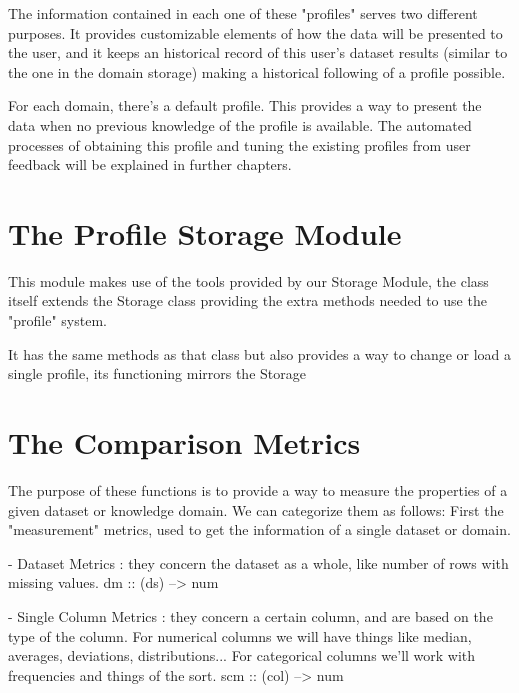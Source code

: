 The information contained in each one of these "profiles" serves two different purposes. It provides customizable elements of  how  the data will be presented to the user, and it keeps an historical record of this user's dataset results (similar to the one in the domain storage) making a historical following of a profile possible.

For each domain, there's a  default  profile. This provides a way to present the data when no previous knowledge of the profile is available. The automated processes of obtaining this profile and tuning the existing profiles from user feedback will be explained in further chapters.


\section{The Profile Storage Module}
\label{cap2:sec:profilestorage}

This module makes use of the tools provided by our Storage Module, the class itself extends the Storage class providing the extra methods needed to use the "profile" system.

It has the same methods as that class but also provides a way to change or load a single profile, its functioning mirrors the Storage

\section{The Comparison Metrics}
\label{cap2:sec:metrics}

The purpose of these functions is to provide a way to measure the properties of a given dataset or knowledge domain.
We can categorize them as follows:
First the "measurement" metrics, used to get the information of a single dataset or domain.

  - Dataset Metrics : they concern the dataset as a whole, like number of rows with missing values.
    dm :: (ds) --> num
    
  - Single Column Metrics : they concern a certain column, and are based on the type of the column.
    For numerical columns we will have things like median, averages, deviations, distributions...
    For categorical columns we'll work with frequencies and things of the sort.
    scm :: (col) --> num
    
